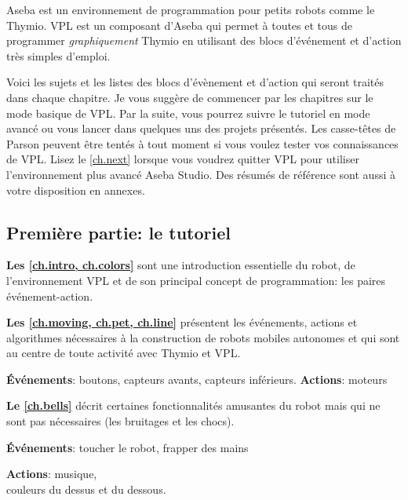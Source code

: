 Aseba est un environnement de programmation pour petits robots comme le Thymio.
VPL est un composant d'Aseba qui permet à toutes et tous de programmer \textit{graphiquement} Thymio en utilisant des blocs d'événement et d'action très simples d'emploi.

Voici les sujets et les listes des blocs d'évènement et d'action qui seront traités dans chaque chapitre.
Je vous suggère de commencer par les chapitres sur le mode basique de VPL.
Par la suite, vous pourrez suivre le tutoriel en mode avancé ou vous lancer dans quelques uns des projets présentés.
Les casse-têtes de Parson peuvent être tentés à tout moment si vous voulez tester vos connaissances de VPL.
Lisez le \cref{ch.next} lorsque vous voudrez quitter VPL pour utiliser l'environnement plus avancé Aseba Studio.
Des résumés de référence sont aussi à votre disposition en annexes.

\subsection*{Première partie: le tutoriel}
\textbf{Les \cref{ch.intro, ch.colors}} sont une introduction essentielle du robot, de l'environnement VPL et de son principal concept de programmation: les paires événement-action.

\hfill{}\quad{}

\medskip

\textbf{Les \cref{ch.moving, ch.pet, ch.line}} présentent les événements, actions et algorithmes nécessaires à la construction de robots mobiles autonomes et qui sont au centre de toute activité avec Thymio et VPL.

\textbf{Événements}: boutons, capteurs avants, capteurs inférieurs.\hfill
\textbf{Actions}: moteurs

 \quad{} \quad {}\hfill
{}

\medskip

\textbf{Le \cref{ch.bells}} décrit certaines fonctionnalités amusantes du robot mais qui ne sont pas nécessaires (les bruitages et les chocs).

\begin{minipage}[t]{0.6\textwidth}
\textbf{Événements}: toucher le robot, frapper des mains
\end{minipage}
\begin{minipage}[t]{0.4\textwidth}
\begin{flushright}
\textbf{Actions}: musique,\\ couleurs du dessus et du dessous.
\end{flushright}
\end{minipage}

